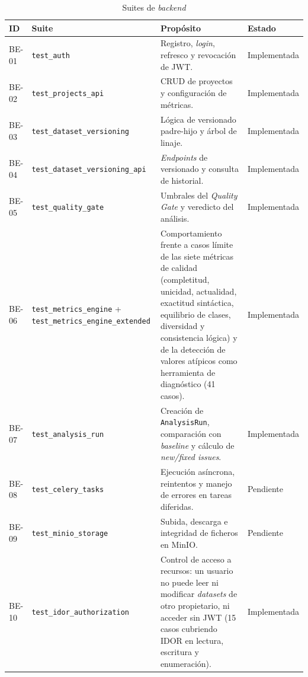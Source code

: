 \begin{table}[H]
  \centering
  \small
  \caption{Suites de \emph{backend}}
  \label{tab:suites-backend}
  \begin{tabularx}{\textwidth}{l >{\hsize=0.7\hsize}X >{\hsize=1.3\hsize}X l}
    \toprule
    \textbf{ID} & \textbf{Suite} & \textbf{Propósito} & \textbf{Estado} \\
    \midrule
    BE-01 & \texttt{test\_auth} &
      Registro, \emph{login}, refresco y revocación de \acs{JWT}.
      & Implementada \\
    BE-02 & \texttt{test\_projects\_api} &
      \acs{CRUD} de proyectos y configuración de métricas.
      & Implementada \\
    BE-03 & \texttt{test\_dataset\_versioning} &
      Lógica de versionado padre-hijo y árbol de linaje.
      & Implementada \\
    BE-04 & \texttt{test\_dataset\_versioning\_api} &
      \emph{Endpoints} de versionado y consulta de historial.
      & Implementada \\
    BE-05 & \texttt{test\_quality\_gate} &
      Umbrales del \emph{Quality Gate} y veredicto del análisis.
      & Implementada \\
    BE-06 & \texttt{test\_metrics\_engine} +
            \texttt{test\_metrics\_engine\_extended} &
      Comportamiento frente a casos límite de las siete métricas de
      calidad (completitud, unicidad, actualidad, exactitud sintáctica,
      equilibrio de clases, diversidad y consistencia lógica) y de la
      detección de valores atípicos como herramienta de diagnóstico
      (41 casos).
      & Implementada \\
    BE-07 & \texttt{test\_analysis\_run} &
      Creación de \texttt{AnalysisRun}, comparación con \emph{baseline}
      y cálculo de \emph{new/fixed issues}.
      & Implementada \\
    BE-08 & \texttt{test\_celery\_tasks} &
      Ejecución asíncrona, reintentos y manejo de errores en tareas
      diferidas.
      & Pendiente \\
    BE-09 & \texttt{test\_minio\_storage} &
      Subida, descarga e integridad de ficheros en MinIO.
      & Pendiente \\
    BE-10 & \texttt{test\_idor\_authorization} &
      Control de acceso a recursos: un usuario no puede leer ni
      modificar \emph{datasets} de otro propietario, ni acceder sin
      \acs{JWT} (15 casos cubriendo \acs{IDOR} en lectura, escritura y
      enumeración).
      & Implementada \\
    \bottomrule
  \end{tabularx}
\end{table}

